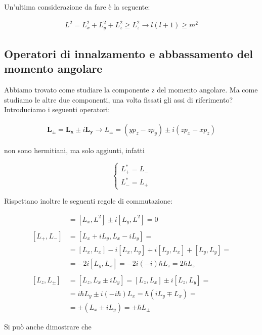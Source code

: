 Un'ultima considerazione da fare è la seguente: 

\begin{align}
L^2 = L_x^2 + L_y^2 + L_z^2 \geq L_z^2 \rightarrow l(l+1) \geq m^2
\end{align}

\newpage  
  
\subsection{Operatori di innalzamento e abbassamento del momento angolare}

Abbiamo trovato come studiare la componente z del momento angolare. Ma come studiamo le altre due componenti, una volta fissati gli assi di riferimento? Introduciamo i seguenti operatori:

\begin{align}
\mathbf{L_{\pm}}=  \mathbf{L_x} \pm i\mathbf{L_y} \rightarrow L_\pm= (yp_z - zp_y) \pm i(zp_x - xp_z)
\end{align}

non sono hermitiani, ma solo aggiunti, infatti

\begin{equation}
\left\{
\begin{array}{ccc}
L^*_+ = L_-\\
L^*_-=L_+
\end{array} \right.
\end{equation}

Rispettano inoltre le seguenti regole di commutazione:

\begin{align}
[L_{\pm}, L^2] {}&= [L_x, L^2] \pm i[L_y, L^2] = 0  \\
\nonumber \\
[L_+,L_-] &= [ L_x + iL_y, L_x - iL_y]= \nonumber \\
&= [L_x, L_x] -i[L_x,L_y]+i[L_y,L_x]+[L_y,L_y]= \nonumber \\
&= -2i[L_y,L_x]= -2i(-i)\hbar L_z= 2 \hbar L_z \\
\nonumber \\
[L_z, L_\pm] &= [L_z, L_x \pm i L_y]= [L_z, L_x] \pm i [L_z,L_y]= \nonumber \\
&= i \hbar L_y \pm i (-i \hbar) L_x = \hbar(iL_y \mp L_x)= \nonumber \\
&= \pm(L_x \pm iL_y)=  \pm \hbar L_\pm
\end{align}

Si può anche dimostrare che

